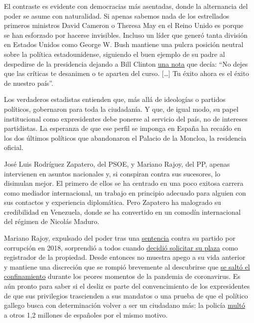 El contraste es evidente con democracias más asentadas, donde la
alternancia del poder se asume con naturalidad. Si apenas sabemos nada
de los estrellados primeros ministros David Cameron o Theresa May en el
Reino Unido es porque se han esforzado por hacerse invisibles. Incluso
un líder que generó tanta división en Estados Unidos como George W. Bush
mantiene una pulcra posición neutral sobre la política estadounidense,
siguiendo el buen ejemplo de su padre al despedirse de la presidencia
dejando a Bill Clinton
\href{https://www.lavanguardia.com/economia/20200725/482489048270/seguridad-social-cita-previa-covid.html}{una
nota} que decía: ``No dejes que las críticas te desanimen o te aparten
del curso. {[}\ldots{}{]} Tu éxito ahora es el éxito de nuestro país''.

Los verdaderos estadistas entienden que, más allá de ideologías o
partidos políticos, gobernaron para toda la ciudadanía. Y que, de igual
modo, su papel institucional como expresidentes debe ponerse al servicio
del país, no de intereses partidistas. La esperanza de que ese perfil se
imponga en España ha recaído en los dos últimos políticos que
abandonaron el Palacio de la Moncloa, la residencia oficial.

José Luis Rodríguez Zapatero, del PSOE, y Mariano Rajoy, del PP, apenas
intervienen en asuntos nacionales y, si conspiran contra sus sucesores,
lo disimulan mejor. El primero de ellos se ha centrado en una poco
exitosa carrera como mediador internacional, un trabajo en principio
adecuado para alguien con sus contactos y experiencia diplomática. Pero
Zapatero ha malogrado su credibilidad en Venezuela, donde se ha
convertido en un comodín internacional del régimen de Nicolás Maduro.

Mariano Rajoy, expulsado del poder tras una
\href{https://www.nytimes.com/es/2018/05/24/espanol/partido-popular-corrupcion-rajoy-gurtel.html}{sentencia}
contra su partido por corrupción en 2018, sorprendió a todos cuando
\href{https://www.elconfidencial.com/espana/2018-10-22/mariano-rajoy-plaza-registro-mercantil-madrid_1633814/}{decidió
solicitar su plaza} como registrador de la propiedad. Desde entonces no
muestra apego a su vida anterior y mantiene una discreción que se rompió
brevemente al descubrirse que
\href{https://www.elconfidencial.com/espana/2020-04-29/policia-mariano-rajoy-ruptura-confinamiento_2573336/}{se
saltó el confinamiento} durante los peores momentos de la pandemia de
coronavirus. Es aún pronto para saber si el desliz es parte del
convencimiento de los expresidentes de que sus privilegios trascienden a
sus mandatos o una prueba de que el político gallego busca con
determinación volver a ser un ciudadano más: la policía
\href{https://www.laprovincia.es/espana/2020/06/20/alarma-cierra-1-millones-multas/1293308.html}{multó}
a otros 1,2 millones de españoles por el mismo motivo.

